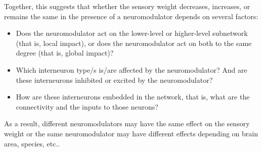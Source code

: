\documentclass[10pt,a4paper]{article}
\begin{document}
Together, this suggests that whether the sensory weight decreases, increases, or remains the same in the presence of a neuromodulator depends on several factors:
%
\begin{itemize}
\item Does the neuromodulator act on the lower-level or higher-level subnetwork (that is, local impact), or does the neuromodulator act on both to the same degree (that is, global impact)?
\item Which interneuron type/s is/are affected by the neuromodulator? And are these interneurons inhibited or excited by the neuromodulator?
\item How are these interneurons embedded in the network, that is, what are the connectivity and the inputs to those neurons?
\end{itemize}
%
As a result, different neuromodulators may have the same effect on the sensory weight or the same neuromodulator may have different effects depending on brain area, species, etc..
\end{document}
